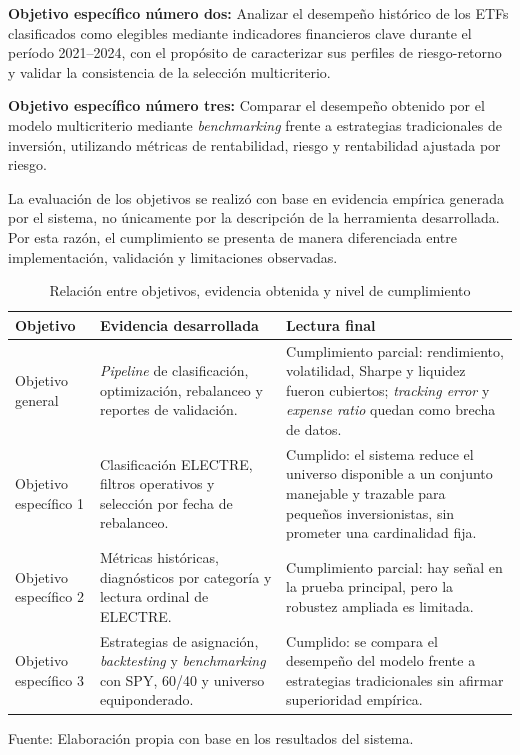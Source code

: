 \documentclass[12pt,letterpaper]{article}
\newcommand{\fuente}[1]{\begin{center}\small Fuente: #1\end{center}}
\begin{document}
\textbf{Objetivo específico número dos:} Analizar el desempeño histórico de los ETFs clasificados como elegibles mediante indicadores financieros clave durante el período 2021--2024, con el propósito de caracterizar sus perfiles de riesgo-retorno y validar la consistencia de la selección multicriterio.

\textbf{Objetivo específico número tres:} Comparar el desempeño obtenido por el modelo multicriterio mediante \textit{benchmarking} frente a estrategias tradicionales de inversión, utilizando métricas de rentabilidad, riesgo y rentabilidad ajustada por riesgo.

La evaluación de los objetivos se realizó con base en evidencia empírica generada por el sistema, no únicamente por la descripción de la herramienta desarrollada. Por esta razón, el cumplimiento se presenta de manera diferenciada entre implementación, validación y limitaciones observadas.

\begin{table}[H]
\centering
\caption{Relación entre objetivos, evidencia obtenida y nivel de cumplimiento}
\label{tab:objetivos_evidencia}
\begin{tabular}{p{3.3cm}p{5.2cm}p{5.2cm}}
\toprule
\textbf{Objetivo} & \textbf{Evidencia desarrollada} & \textbf{Lectura final} \\
\midrule
Objetivo general & \textit{Pipeline} de clasificación, optimización, rebalanceo y reportes de validación. & Cumplimiento parcial: rendimiento, volatilidad, Sharpe y liquidez fueron cubiertos; \textit{tracking error} y \textit{expense ratio} quedan como brecha de datos. \\
Objetivo específico 1 & Clasificación ELECTRE, filtros operativos y selección por fecha de rebalanceo. & Cumplido: el sistema reduce el universo disponible a un conjunto manejable y trazable para pequeños inversionistas, sin prometer una cardinalidad fija. \\
Objetivo específico 2 & Métricas históricas, diagnósticos por categoría y lectura ordinal de ELECTRE. & Cumplimiento parcial: hay señal en la prueba principal, pero la robustez ampliada es limitada. \\
Objetivo específico 3 & Estrategias de asignación, \textit{backtesting} y \textit{benchmarking} con SPY, 60/40 y universo equiponderado. & Cumplido: se compara el desempeño del modelo frente a estrategias tradicionales sin afirmar superioridad empírica. \\
\bottomrule
\end{tabular}
\end{table}
\fuente{Elaboración propia con base en los resultados del sistema.}
\end{document}
